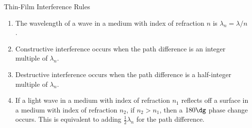 \documentclass{article}
\begin{document}
\begin{thm}{Thin-Film Interference Rules}
    \begin{enumerate}
        \item The wavelength of a wave in a medium with index of refraction $n$ is $\lambda_n = \lambda / n$. 
        \item Constructive interference occurs when the path difference is an integer multiple of $\lambda_n$. 
        \item Destructive interference occurs when the path difference is a half-integer multiple of $\lambda_n$. 
        \item If a light wave in a medium with index of refraction $n_1$ reflects off a surface in a medium with index of refraction $n_2$, if $n_2 > n_1$, then a $180\dg$ phase change occurs. This is equivalent to adding $\frac{1}{2}\lambda_n$ for the path difference. 
    \end{enumerate}
\end{thm}
\end{document}
